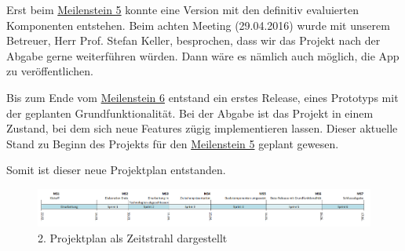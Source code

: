 Erst beim \hyperref[pm-ms5]{Meilenstein 5} konnte eine Version mit den definitiv evaluierten Komponenten entstehen. 
Beim achten Meeting (29.04.2016) wurde mit unserem Betreuer, Herr Prof. Stefan Keller, besprochen, dass wir das Projekt nach der Abgabe gerne weiterführen würden.
Dann wäre es nämlich auch möglich, die App zu veröffentlichen.

Bis zum Ende vom \hyperref[pm-ms6]{Meilenstein 6} entstand ein erstes Release, eines Prototyps mit der geplanten Grundfunktionalität. 
Bei der Abgabe ist das Projekt in einem Zustand, bei dem sich neue Features zügig implementieren lassen.
Dieser aktuelle Stand zu Beginn des Projekts für den \hyperref[pm-ms5]{Meilenstein 5} geplant gewesen.

Somit ist dieser neue Projektplan entstanden.

\begin{figure}[H]
	\centering
	\includegraphics[width=\textwidth]{images/projektmanagement/zeitstrahl_v2.png}
	\caption{2. Projektplan als Zeitstrahl dargestellt}
	\label{image-project-plan-timeline2}
\end{figure}




